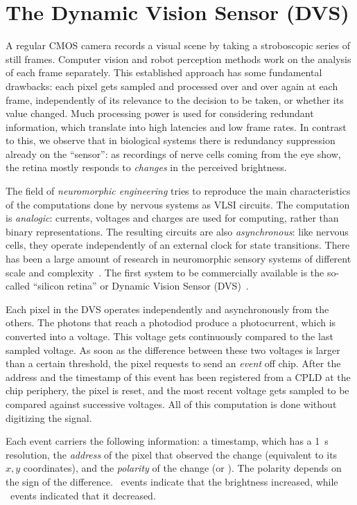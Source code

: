 
\section{The Dynamic Vision Sensor (DVS)\label{sec:The-DVS-camera}}

A regular CMOS camera records a visual scene by taking a stroboscopic
series of still frames. Computer vision and robot perception methods
work on the analysis of each frame separately. This established approach
has some fundamental drawbacks: each pixel gets sampled and processed
over and over again at each frame, independently of its relevance
to the decision to be taken, or whether its value changed. Much processing
power is used for considering redundant information, which translate
into high latencies and low frame rates. In contrast to this, we observe
that in biological systems there is redundancy suppression already
on the \textquotedblleft{}sensor\textquotedblright{}: as recordings
of nerve cells coming from the eye show, the retina mostly responds
to \emph{changes} in the perceived brightness.

The field of\emph{ neuromorphic engineering} tries to reproduce the
main characteristics of the computations done by nervous systems as
VLSI circuits. The computation is \emph{analogic}: currents, voltages
and charges are used for computing, rather than binary representations.
The resulting circuits are also \emph{asynchronous}: like nervous
cells, they operate independently of an external clock for state transitions.
There has been a large amount of research in neuromorphic sensory
systems of different scale and complexity~\cite{liu10neuromorphic}.
The first system to be commercially available is the so-called ``silicon
retina'' or Dynamic Vision Sensor\emph{ }(DVS)~\cite{lichtsteiner08asynchronous}.

Each pixel in the DVS operates independently and asynchronously from
the others. The photons that reach a photodiod produce a photocurrent,
which is converted into a voltage. This voltage gets continuously
compared to the last sampled voltage. As soon as the difference between
these two voltages is larger than a certain threshold, the pixel requests
to send an \emph{event} off chip. After the address and the timestamp
of this event has been registered from a CPLD at the chip periphery,
the pixel is reset, and the most recent voltage gets sampled to be
compared against successive voltages. All of this computation is done
without digitizing the signal. 

Each event carriers the following information: a timestamp, which
has a 1~\textmu{}s resolution, the \emph{address }of the pixel that
observed the change (equivalent to its~$x,y$ coordinates), and the
\emph{polarity} of the change (\pP or \pN). The polarity depends
on the sign of the difference. \pP~events indicate that the brightness
increased, while \pN~events indicated that it decreased.

